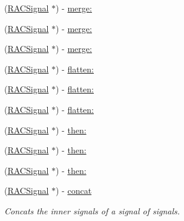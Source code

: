 \begin{DoxyCompactItemize}
\item 
(\mbox{\hyperlink{interface_r_a_c_signal}{R\+A\+C\+Signal}} $\ast$) -\/ \mbox{\hyperlink{interface_r_a_c_signal_aeda66daaf146a2d218ba7819297628a9}{merge\+:}}
\item 
(\mbox{\hyperlink{interface_r_a_c_signal}{R\+A\+C\+Signal}} $\ast$) -\/ \mbox{\hyperlink{interface_r_a_c_signal_aeda66daaf146a2d218ba7819297628a9}{merge\+:}}
\item 
(\mbox{\hyperlink{interface_r_a_c_signal}{R\+A\+C\+Signal}} $\ast$) -\/ \mbox{\hyperlink{interface_r_a_c_signal_aeda66daaf146a2d218ba7819297628a9}{merge\+:}}
\item 
(\mbox{\hyperlink{interface_r_a_c_signal}{R\+A\+C\+Signal}} $\ast$) -\/ \mbox{\hyperlink{interface_r_a_c_signal_a72e5f2fd80960ee5422e08ceef0f4e2c}{flatten\+:}}
\item 
(\mbox{\hyperlink{interface_r_a_c_signal}{R\+A\+C\+Signal}} $\ast$) -\/ \mbox{\hyperlink{interface_r_a_c_signal_a72e5f2fd80960ee5422e08ceef0f4e2c}{flatten\+:}}
\item 
(\mbox{\hyperlink{interface_r_a_c_signal}{R\+A\+C\+Signal}} $\ast$) -\/ \mbox{\hyperlink{interface_r_a_c_signal_a72e5f2fd80960ee5422e08ceef0f4e2c}{flatten\+:}}
\item 
(\mbox{\hyperlink{interface_r_a_c_signal}{R\+A\+C\+Signal}} $\ast$) -\/ \mbox{\hyperlink{interface_r_a_c_signal_aeed35de5a36e70f87721a0ad6ffabecd}{then\+:}}
\item 
(\mbox{\hyperlink{interface_r_a_c_signal}{R\+A\+C\+Signal}} $\ast$) -\/ \mbox{\hyperlink{interface_r_a_c_signal_aeed35de5a36e70f87721a0ad6ffabecd}{then\+:}}
\item 
(\mbox{\hyperlink{interface_r_a_c_signal}{R\+A\+C\+Signal}} $\ast$) -\/ \mbox{\hyperlink{interface_r_a_c_signal_aeed35de5a36e70f87721a0ad6ffabecd}{then\+:}}
\item 
\mbox{\label{interface_r_a_c_signal_a68bff1ad76f3dddda45dcf3dc98a1ae2}} 
(\mbox{\hyperlink{interface_r_a_c_signal}{R\+A\+C\+Signal}} $\ast$) -\/ \mbox{\hyperlink{interface_r_a_c_signal_a68bff1ad76f3dddda45dcf3dc98a1ae2}{concat}}
\begin{DoxyCompactList}\small\item\em Concats the inner signals of a signal of signals. \end{DoxyCompactList}\item 
\mbox{\label{interface_r_a_c_signal_a68bff1ad76f3dddda45dcf3dc98a1ae2}} 

\end{DoxyCompactItemize}
